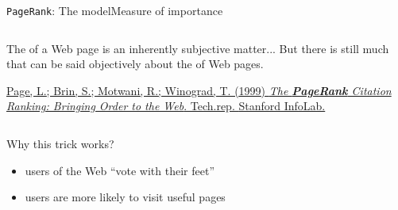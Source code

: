 \documentclass[xcolor=table,final]{beamer} %
\newcommand{\PageRank}{\texttt{PageRank}\xspace}
\begin{document}
\begin{frame}{\PageRank : The model}{Measure of importance}
\begin{columns}
\begin{column}{0.7\textwidth}
\begin{exampleblock}{}
        The  of a Web page is an inherently subjective matter...%
        But there is still much that can be said \alert{objectively} about the  of Web pages.

        \href{http://ilpubs.stanford.edu:8090/422/}{{\tiny
            \underline{Page, L.}; \underline{Brin, S.}; Motwani, R.; Winograd, T. (\underline{1999}) 
            \textit{The \textbf{PageRank} Citation Ranking: Bringing Order to the Web}. Tech.rep. \underline{Stanford} InfoLab.}}
      \end{exampleblock}
    \end{column}
  \end{columns}
  \pause
  \begin{centering}
  \end{centering}
  \begin{block}{Why this trick works?}
    \begin{itemize}
    \item users of the Web ``vote with their feet'' %
    \item users are more likely to visit useful pages
    \end{itemize}
  \end{block}
\end{frame}
\end{document}
